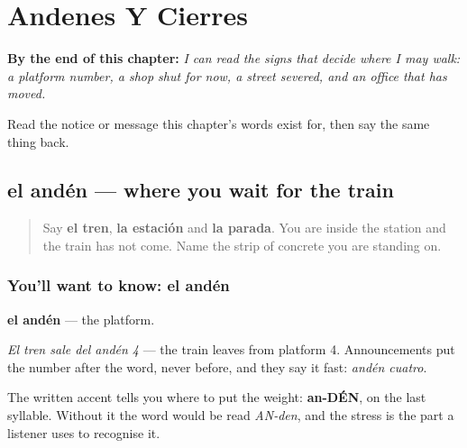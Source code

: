 
\chapter{Andenes Y Cierres}
\label{ch:es-via}

\begin{chapteropening}
\textbf{By the end of this chapter:} \emph{I can read the signs that decide where I may walk: a platform number, a shop shut for now, a street severed, and an office that has moved.}

Read the notice or message this chapter's words exist for, then say the same thing back.
\end{chapteropening}

\section[el andén]{el andén — where you wait for the train}

\label{lesson:ES-C439-anden}



\begin{quote}
Say \textbf{el tren}, \textbf{la estación} and \textbf{la parada}. You are inside the station and the train has not come. Name the strip of concrete you are standing on.
\end{quote}

\subsection*{You'll want to know: el andén}
\textbf{el andén} — the platform.

\emph{El tren sale del andén 4} — the train leaves from platform 4. Announcements put the number after the word, never before, and they say it fast: \emph{andén cuatro}.

The written accent tells you where to put the weight: \textbf{an-DÉN}, on the last syllable. Without it the word would be read \emph{AN-den}, and the stress is the part a listener uses to recognise it.

